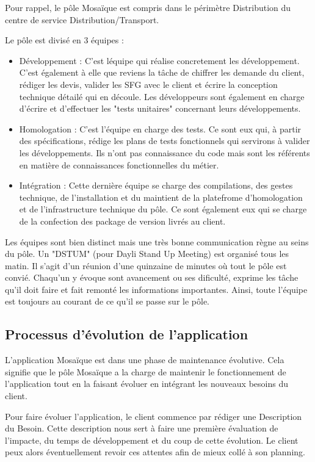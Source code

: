Pour rappel, le pôle Mosaïque est compris dans le périmètre Distribution du centre de service Distribution/Transport.

Le pôle est divisé en 3 équipes :

\begin{itemize}
    \item Développement : C'est léquipe qui réalise concretement les développement. C'est également à elle que reviens la tâche de chiffrer les demande du client, rédiger les devis, valider les SFG avec le client et écrire la conception technique détailé qui en découle. Les développeurs sont également en charge d'écrire et d'effectuer les "tests unitaires" concernant leurs développements. 
    \item Homologation : C'est l'équipe en charge des tests. Ce sont eux qui, à partir des spécifications, rédige les plans de tests fonctionnels qui servirons à valider les développements. Ils n'ont pas connaissance du code mais sont les référents en matière de connaissances fonctionnelles du métier.
    \item Intégration : Cette dernière équipe se charge des compilations, des gestes technique, de l'installation et du maintient de la platefrome d'homologation et de l'infrastructure technique du pôle. Ce sont également eux qui se charge de la confection des package de version livrés au client.
\end{itemize}

Les équipes sont bien distinct mais une très bonne communication règne au seins du pôle. Un "DSTUM" (pour Dayli Stand Up Meeting) est organisé tous les matin. Il s'agit d'un réunion d'une quinzaine de minutes où tout le pôle est convié. Chaqu'un y évoque sont avancement ou ses dificulté, exprime les tâche qu'il doit faire et fait remonté les informations importantes. Ainsi, toute l'équipe est toujours au courant de ce qu'il se passe sur le pôle.

\subsection{Processus d'évolution de l'application}

    L'application Mosaïque est dans une phase de maintenance évolutive. Cela signifie que le pôle Mosaïque a la charge de maintenir le fonctionnement de l'application tout en la faisant évoluer en intégrant les nouveaux besoins du client.
    
    Pour faire évoluer l'application, le client commence par rédiger une Description du Besoin. Cette description nous sert à faire une première évaluation de l'impacte, du temps de développement et du coup de cette évolution. Le client peux alors éventuellement revoir ces attentes afin de mieux collé à son planning.
    

